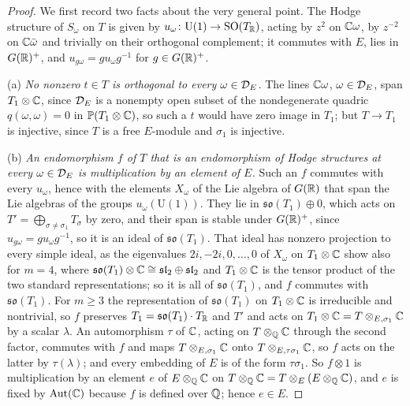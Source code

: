 \begin{proof}
We first record two facts about the very general point. The Hodge structure
of $S_{\omega}$ on $T$ is given by
$u_{\omega}\colon\mathrm{U}(1)\to\operatorname{SO}(T_{\mathbb{R}})$, acting by $z^{2}$ on
$\mathbb{C}\omega$, by $z^{-2}$ on $\mathbb{C}\bar\omega$ and trivially on their orthogonal
complement; it commutes with $E$, lies in $G(\mathbb{R})^{+}$, and
$u_{g\omega}=gu_{\omega}g^{-1}$ for $g\in G(\mathbb{R})^{+}$.

(a) \emph{No nonzero $t\in T$ is orthogonal to every $\omega\in\mathcal{D}_{E}$.} The
lines $\mathbb{C}\omega$, $\omega\in\mathcal{D}_{E}$, span $T_{1}\otimes\mathbb{C}$, since
$\mathcal{D}_{E}$ is a nonempty open subset of the nondegenerate quadric
$q(\omega,\omega)=0$ in $\mathbb{P}(T_{1}\otimes\mathbb{C})$, so such a $t$
would have zero image in $T_{1}$; but $T\to T_{1}$ is injective, since $T$ is
a free $E$-module and $\sigma_{1}$ is injective.

(b) \emph{An endomorphism $f$ of $T$ that is an endomorphism of Hodge
structures at every $\omega\in\mathcal{D}_{E}$ is multiplication by an element of
$E$.} Such an $f$ commutes with every $u_{\omega}$, hence with the elements
$X_{\omega}$ of the Lie algebra of $G(\mathbb{R})$ that span the Lie algebras of
the groups $u_{\omega}(\mathrm{U}(1))$. They lie in
$\mathfrak{so}(T_{1})\oplus0$, which acts on
$T'=\bigoplus_{\sigma\ne\sigma_{1}}T_{\sigma}$ by zero, and their span is
stable under $G(\mathbb{R})^{+}$, since $u_{g\omega}=gu_{\omega}g^{-1}$, so it is an
ideal of $\mathfrak{so}(T_{1})$. That ideal has nonzero projection to every
simple ideal, as the eigenvalues $2i,-2i,0,\dots,0$ of $X_{\omega}$ on
$T_{1}\otimes\mathbb{C}$ show also for $m=4$, where
$\mathfrak{so}(T_{1})\otimes\mathbb{C}\cong\mathfrak{sl}_{2}\oplus\mathfrak{sl}_{2}$
and $T_{1}\otimes\mathbb{C}$ is the tensor product of the two standard
representations; so it is all of $\mathfrak{so}(T_{1})$, and $f$ commutes
with $\mathfrak{so}(T_{1})$. For $m\ge3$ the representation of
$\mathfrak{so}(T_{1})$ on $T_{1}\otimes\mathbb{C}$ is irreducible and nontrivial, so
$f$ preserves $T_{1}=\mathfrak{so}(T_{1})\cdot T_{\mathbb{R}}$ and $T'$ and acts on
$T_{1}\otimes\mathbb{C}=T\otimes_{E,\sigma_{1}}\mathbb{C}$ by a scalar $\lambda$. An
automorphism $\tau$ of $\mathbb{C}$, acting on $T\otimes_{\mathbb{Q}}\mathbb{C}$ through the
second factor, commutes with $f$ and maps $T\otimes_{E,\sigma_{1}}\mathbb{C}$ onto
$T\otimes_{E,\tau\sigma_{1}}\mathbb{C}$, so $f$ acts on the latter by
$\tau(\lambda)$; and every embedding of $E$ is of the form $\tau\sigma_{1}$.
So $f\otimes1$ is multiplication by an element $e$ of $E\otimes_{\mathbb{Q}}\mathbb{C}$ on
$T\otimes_{\mathbb{Q}}\mathbb{C}=T\otimes_{E}(E\otimes_{\mathbb{Q}}\mathbb{C})$, and $e$ is fixed by
$\mathrm{Aut}(\mathbb{C})$ because $f$ is defined over $\mathbb{Q}$; hence $e\in E$.


\end{proof}
